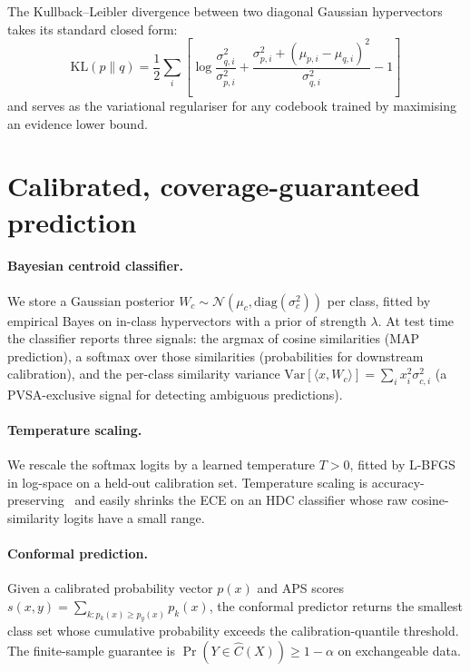 \documentclass[11pt]{article}
\begin{document}
The Kullback--Leibler divergence between two diagonal Gaussian
hypervectors takes its standard closed form:
\begin{equation}
\mathrm{KL}(p \| q) = \frac{1}{2} \sum_i \left[ \log \frac{\sigma_{q,i}^2}{\sigma_{p,i}^2}
+ \frac{\sigma_{p,i}^2 + (\mu_{p,i} - \mu_{q,i})^2}{\sigma_{q,i}^2} - 1 \right]
\end{equation}
and serves as the variational regulariser for any codebook trained by
maximising an evidence lower bound.

\section{Calibrated, coverage-guaranteed prediction}
\label{sec:prediction}

\paragraph{Bayesian centroid classifier.} We store a Gaussian posterior
$W_c \sim \mathcal{N}(\mu_c, \mathrm{diag}(\sigma_c^2))$ per class,
fitted by empirical Bayes on in-class hypervectors with a prior of
strength $\lambda$. At test time the classifier reports three signals:
the argmax of cosine similarities (MAP prediction), a softmax over
those similarities (probabilities for downstream calibration), and the
per-class similarity variance $\mathrm{Var}[\langle x, W_c \rangle]
= \sum_i x_i^2 \sigma_{c,i}^2$ (a PVSA-exclusive signal for detecting
ambiguous predictions).

\paragraph{Temperature scaling.} We rescale the softmax logits by a
learned temperature $T > 0$, fitted by L-BFGS in log-space on a
held-out calibration set. Temperature scaling is
accuracy-preserving~\citep{guo2017calibration} and easily shrinks
the ECE on an HDC classifier whose raw cosine-similarity logits have a
small range.

\paragraph{Conformal prediction.} Given a calibrated probability vector
$p(x)$ and APS scores $s(x, y) = \sum_{k: p_k(x) \geq p_y(x)} p_k(x)$,
the conformal predictor returns the smallest class set whose cumulative
probability exceeds the calibration-quantile threshold. The
finite-sample guarantee is
$\Pr(Y \in \hat{C}(X)) \geq 1 - \alpha$ on exchangeable data.
\end{document}
